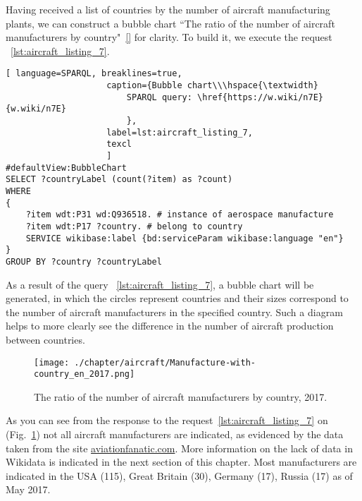 Having received a list of countries by the number of aircraft manufacturing plants, we can construct a bubble chart 
``The ratio of the number of aircraft manufacturers by country"~\ref{} for clarity. To build it, we execute the request ~\ref{lst:aircraft_listing_7}.

\begin{lstlisting}[ language=SPARQL, breaklines=true, 
                    caption={Bubble chart\\\hspace{\textwidth}
                        SPARQL query: \href{https://w.wiki/n7E}{w.wiki/n7E}
                        },
                    label=lst:aircraft_listing_7,
                    texcl 
                    ]
#defaultView:BubbleChart
SELECT ?countryLabel (count(?item) as ?count)
WHERE
{
    ?item wdt:P31 wd:Q936518. # instance of aerospace manufacture
  	?item wdt:P17 ?country. # belong to country
    SERVICE wikibase:label {bd:serviceParam wikibase:language "en"}
}
GROUP BY ?country ?countryLabel
\end{lstlisting}

As a result of the query ~\ref{lst:aircraft_listing_7}, a bubble chart will be generated, in which the circles represent countries and their 
sizes correspond to the number of aircraft manufacturers in the specified country. Such a diagram helps to more clearly see the difference 
in the number of aircraft production between countries.

\begin{figure}[h!]
\centering
	\texttt{[image: ./chapter/aircraft/Manufacture-with-country\_en\_2017.png]}
	\caption{The ratio of the number of aircraft manufacturers by country, 2017.}
	\label{fig:Manufacture-with-country_en_2017}
\end{figure}

As you can see from the response to the request~\ref{lst:aircraft_listing_7} on (Fig.~\ref{fig:Manufacture-with-country_en_2017}) not all 
aircraft manufacturers are indicated, as evidenced by the data taken from the site \href{https://www.aviationfanatic.com/}{aviationfanatic.com}. 
More information on the lack of data in Wikidata is indicated in the next section of this chapter. Most manufacturers are indicated in the 
USA (115), Great Britain (30), Germany (17), Russia (17) as of May 2017.

